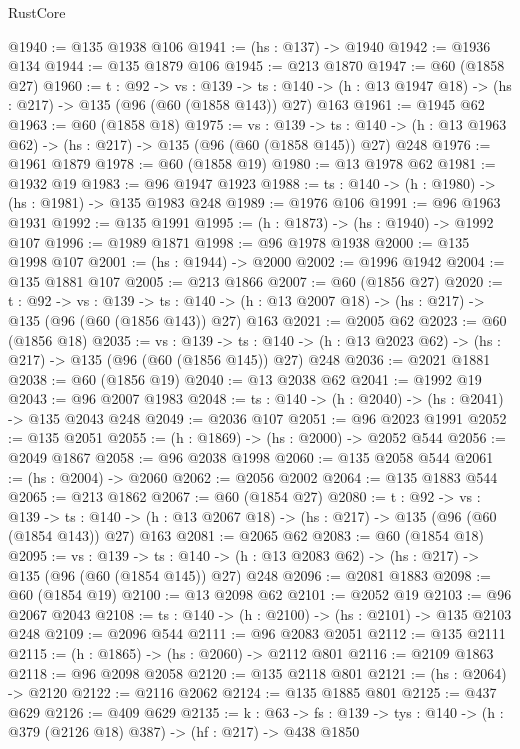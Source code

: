 \begin{lexlean}{RustCore}
\begin{coremodule}
@1940 := @135 @1938 @106
@1941 := (hs : @137) -> @1940
@1942 := @1936 @134
@1944 := @135 @1879 @106
@1945 := @213 @1870
@1947 := @60 (@1858 @27)
@1960 := {t : @92} ->
  {vs : @139} ->
  {ts : @140} -> (h : @13 @1947 @18) -> (hs : @217) -> @135 (@96 (@60 (@1858 @143)) @27) @163
@1961 := @1945 @62
@1963 := @60 (@1858 @18)
@1975 := {vs : @139} ->
  {ts : @140} -> (h : @13 @1963 @62) -> (hs : @217) -> @135 (@96 (@60 (@1858 @145)) @27) @248
@1976 := @1961 @1879
@1978 := @60 (@1858 @19)
@1980 := @13 @1978 @62
@1981 := @1932 @19
@1983 := @96 @1947 @1923
@1988 := {ts : @140} -> (h : @1980) -> (hs : @1981) -> @135 @1983 @248
@1989 := @1976 @106
@1991 := @96 @1963 @1931
@1992 := @135 @1991
@1995 := (h : @1873) -> (hs : @1940) -> @1992 @107
@1996 := @1989 @1871
@1998 := @96 @1978 @1938
@2000 := @135 @1998 @107
@2001 := (hs : @1944) -> @2000
@2002 := @1996 @1942
@2004 := @135 @1881 @107
@2005 := @213 @1866
@2007 := @60 (@1856 @27)
@2020 := {t : @92} ->
  {vs : @139} ->
  {ts : @140} -> (h : @13 @2007 @18) -> (hs : @217) -> @135 (@96 (@60 (@1856 @143)) @27) @163
@2021 := @2005 @62
@2023 := @60 (@1856 @18)
@2035 := {vs : @139} ->
  {ts : @140} -> (h : @13 @2023 @62) -> (hs : @217) -> @135 (@96 (@60 (@1856 @145)) @27) @248
@2036 := @2021 @1881
@2038 := @60 (@1856 @19)
@2040 := @13 @2038 @62
@2041 := @1992 @19
@2043 := @96 @2007 @1983
@2048 := {ts : @140} -> (h : @2040) -> (hs : @2041) -> @135 @2043 @248
@2049 := @2036 @107
@2051 := @96 @2023 @1991
@2052 := @135 @2051
@2055 := (h : @1869) -> (hs : @2000) -> @2052 @544
@2056 := @2049 @1867
@2058 := @96 @2038 @1998
@2060 := @135 @2058 @544
@2061 := (hs : @2004) -> @2060
@2062 := @2056 @2002
@2064 := @135 @1883 @544
@2065 := @213 @1862
@2067 := @60 (@1854 @27)
@2080 := {t : @92} ->
  {vs : @139} ->
  {ts : @140} -> (h : @13 @2067 @18) -> (hs : @217) -> @135 (@96 (@60 (@1854 @143)) @27) @163
@2081 := @2065 @62
@2083 := @60 (@1854 @18)
@2095 := {vs : @139} ->
  {ts : @140} -> (h : @13 @2083 @62) -> (hs : @217) -> @135 (@96 (@60 (@1854 @145)) @27) @248
@2096 := @2081 @1883
@2098 := @60 (@1854 @19)
@2100 := @13 @2098 @62
@2101 := @2052 @19
@2103 := @96 @2067 @2043
@2108 := {ts : @140} -> (h : @2100) -> (hs : @2101) -> @135 @2103 @248
@2109 := @2096 @544
@2111 := @96 @2083 @2051
@2112 := @135 @2111
@2115 := (h : @1865) -> (hs : @2060) -> @2112 @801
@2116 := @2109 @1863
@2118 := @96 @2098 @2058
@2120 := @135 @2118 @801
@2121 := (hs : @2064) -> @2120
@2122 := @2116 @2062
@2124 := @135 @1885 @801
@2125 := @437 @629
@2126 := @409 @629
@2135 := {k : @63} ->
  {fs : @139} -> {tys : @140} -> (h : @379 (@2126 @18) @387) -> (hf : @217) -> @438 @1850

\end{coremodule}
\end{lexlean}
